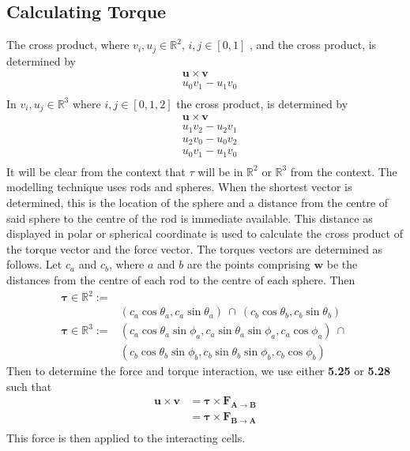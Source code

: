 \subsection{Calculating Torque}
The cross product, where $v_i,u_j\in\mathbb{R}^2$, $i,j\in [0,1]$ , and the cross product, is determined by
\begin{align}
     & \mathbf{u}\times \mathbf{v} \\
     &  u_0v_1 - u_1v_0 \\
\end{align}
In $v_i,u_j\in\mathbb{R}^3$ where $i,j\in [0,1,2]$ the cross product, is determined by
\begin{align}
     &  \mathbf{u}\times \mathbf{v} \\
     &  u_1v_2-u_2v_1 \\
     &  u_2v_0-u_0v_2 \\
     &  u_0v_1-u_1v_0 \\
\end{align}
It will be clear from the context that $\tau$ will be in $\mathbb{R}^2$ or $\mathbb{R}^3$ from the context. The modelling technique uses rods and spheres. When the shortest vector is determined, this is the location of the sphere and a distance from the centre of said sphere to the centre of the rod is immediate available. This distance as displayed in polar or spherical coordinate is used to calculate the cross product of the torque vector and the force vector. The torques vectors are determined as follows. Let $c_a$ and $c_b$, where $a$ and $b$ are the points comprising $\mathbf{w}$ be the distances from the centre of each rod to the centre of each sphere. Then 
\begin{align}
    \mathbf{\tau}\in\mathbb{R}^2 :=  &   \\
                            &   (c_a\cos\theta_a,c_a\sin\theta_a)\>\cap\>(c_b\cos\theta_b,c_b\sin\theta_b) \\
    \mathbf{\tau}\in\mathbb{R}^3 :=  &   (c_a\cos\theta_a\sin\phi_a,c_a\sin\theta_a\sin\phi_a,c_a\cos\phi_a)\>\cap\> \\
                            &   (c_b\cos\theta_b\sin\phi_b,c_b\sin\theta_b\sin\phi_b,c_b\cos\phi_b)
\end{align}
Then to determine the force and torque interaction, we use either \textbf{5.25} or \textbf{5.28} such that
\begin{align}
    \mathbf{u}\times\mathbf{v}  & = \mathbf{\tau}\times \mathbf{F_{A\rightarrow B}} \\
                                & = \mathbf{\tau}\times \mathbf{F_{B\rightarrow A}} \\
\end{align}
This force is then applied to the interacting cells.
